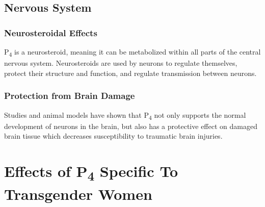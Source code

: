 \documentclass[
	secnumdepth=3, %
]{kaohandt}
\newcommand\tsub[1]{\textsubscript{#1}}
\begin{document}
\subsection{Nervous System}
\subsubsection{Neurosteroidal Effects}
P\tsub{4} is a neurosteroid, meaning it can be metabolized within all parts of the central nervous system. Neurosteroids are used by neurons to regulate themselves, protect their structure and function, and regulate transmission between neurons. 

\subsubsection{Protection from Brain Damage}
Studies and animal models have shown that P\tsub{4} not only supports the normal development of neurons in the brain, but also has a protective effect on damaged brain tissue which decreases susceptibility to traumatic brain injuries.

\section{Effects of P\tsub{4} Specific To Transgender Women}




\end{document}
